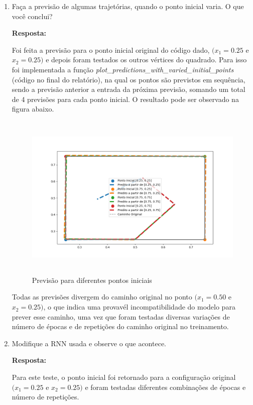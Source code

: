 \documentclass[12 pt]{article}
\begin{document}
\begin{enumerate}
    \item Faça a previsão de algumas trajetórias, quando o ponto inicial varia. O que você conclui?
   
    \textbf{Resposta:} \par

    Foi feita a previsão para o ponto inicial original do código dado, $(x_1=0.25$ e $x_2=0.25)$ e depois foram testados os outros vértices do quadrado. Para isso foi implementada a função \textit{plot\_predictions\_with\_varied\_initial\_points} (código no final do relatório), na qual os pontos são previstos em sequência, sendo a previsão anterior a entrada da próxima previsão, somando um total de 4 previsões para cada ponto inicial. O resultado pode ser observado na figura abaixo.

    \begin{figure}[H]
        \caption{Previsão para diferentes pontos iniciais}
           \centering
           \includegraphics[height=8cm]{fig/Item_3.png}
    \end{figure}
    
    Todas as previsões divergem do caminho original no ponto $(x_1=0.50$ e $x_2=0.25)$, o que indica uma provavél incompatibilidade do modelo para prever esse caminho, uma vez que foram testadas diversas variações de número de épocas e de repetições do caminho original no treinamento.

    \item Modifique a RNN usada e observe o que acontece.

    \textbf{Resposta:} \par

    Para este teste, o ponto inicial foi retornado para a configuração original $(x_1=0.25$ e $x_2=0.25)$ e foram testadas diferentes combinações de épocas e número de repetições.


\end{enumerate}
\end{document}
